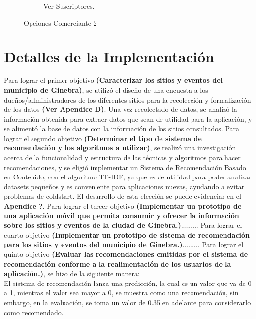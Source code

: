 \documentclass[12pt,letterpaper,openany]{book}
\begin{document}
\begin{figure}[H]
\begin{subfigure}{.4\linewidth}
        \caption{Ver Suscriptores.}
    \end{subfigure}
    \caption{Opciones Comerciante 2}
\end{figure}

\section{Detalles de la Implementación}
Para lograr el primer objetivo \textbf{(Caracterizar los sitios y eventos del municipio de Ginebra)}, se utilizó el diseño de una encuesta a los dueños/administradores de los diferentes sitios para la recolección y formalización de los datos \textbf{(Ver Apendice D)}.
Una vez recolectado de datos, se analizó la información obtenida para extraer datos que sean de utilidad para la aplicación, y se alimentó la base de datos con la información de los sitios consultados.
\vspace{5mm}\newline
Para lograr el segundo objetivo \textbf{(Determinar el tipo de sistema de recomendación y los algoritmos a utilizar)}, se realizó una investigación acerca de la funcionalidad y estructura de las técnicas y algoritmos para hacer recomendaciones, y se eligió implementar un Sistema de Recomendación Basado en Contenido, con el algoritmo TF-IDF, ya que es de utilidad para poder analizar datasets pequeños y es conveniente para aplicaciones nuevas, ayudando a evitar problemas de coldstart. El desarrollo de esta elección se puede evidenciar en el \textbf{Apendice ?}.
\vspace{5mm}\newline
Para lograr el tercer objetivo \textbf{(Implementar un prototipo de una aplicación móvil que permita consumir y ofrecer la información sobre los sitios y eventos de la ciudad de Ginebra.)}.........
\vspace{5mm}\newline
Para lograr el cuarto objetivo \textbf{(Implementar un prototipo de sistema de recomendación para los sitios y eventos del municipio de Ginebra.)}.........
\vspace{5mm}\newline
Para lograr el quinto objetivo \textbf{(Evaluar las recomendaciones emitidas por el sistema de recomendación conforme a la realimentación de los usuarios de la aplicación.)}, se hizo de la siguiente manera:\\
El sistema de recomendación lanza una predicción, la cual es un valor que va de 0 a 1, mientras el valor sea mayor a 0, se muestra como una recomendación, sin embargo, en la evaluación, se toma un valor de 0.35 en adelante para considerarlo como recomendado. \\
\end{document}
